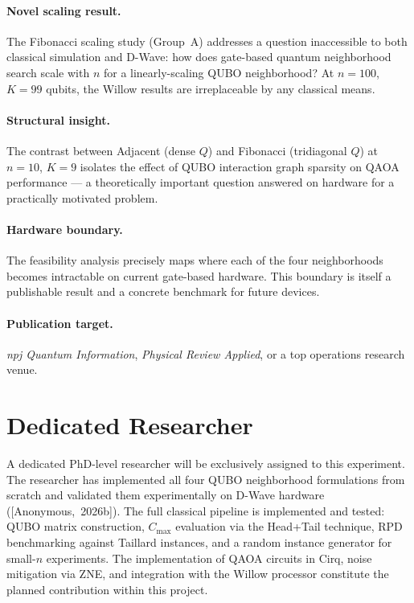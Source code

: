 \documentclass[11pt,a4paper]{article}
\newcommand{\anonB}{[Anonymous,~2026b]}
\begin{document}
\paragraph{Novel scaling result.}
The Fibonacci scaling study (Group~A) addresses a question inaccessible
to both classical simulation and D-Wave: how does gate-based quantum
neighborhood search scale with $n$ for a linearly-scaling QUBO
neighborhood? At $n=100$, $K=99$ qubits, the Willow results are
irreplaceable by any classical means.

\paragraph{Structural insight.}
The contrast between Adjacent (dense $Q$) and Fibonacci (tridiagonal $Q$)
at $n=10$, $K=9$ isolates the effect of QUBO interaction graph sparsity
on QAOA performance --- a theoretically important question answered on
hardware for a practically motivated problem.

\paragraph{Hardware boundary.}
The feasibility analysis precisely maps where each of the four
neighborhoods becomes intractable on current gate-based hardware. This
boundary is itself a publishable result and a concrete benchmark for
future devices.

\paragraph{Publication target.}
\textit{npj Quantum Information}, \textit{Physical Review Applied},
or a top operations research venue.

\section*{Dedicated Researcher}

A dedicated PhD-level researcher will be exclusively assigned to this
experiment. The researcher has implemented all four QUBO neighborhood
formulations from scratch and validated them experimentally on D-Wave
hardware (\anonB{}). The full classical pipeline is implemented and
tested: QUBO matrix construction, $C_{\max}$ evaluation via the Head+Tail
technique, RPD benchmarking against Taillard instances, and a random
instance generator for small-$n$ experiments. The implementation of QAOA
circuits in Cirq, noise mitigation via ZNE, and integration with the
Willow processor constitute the planned contribution within this project.
\end{document}
